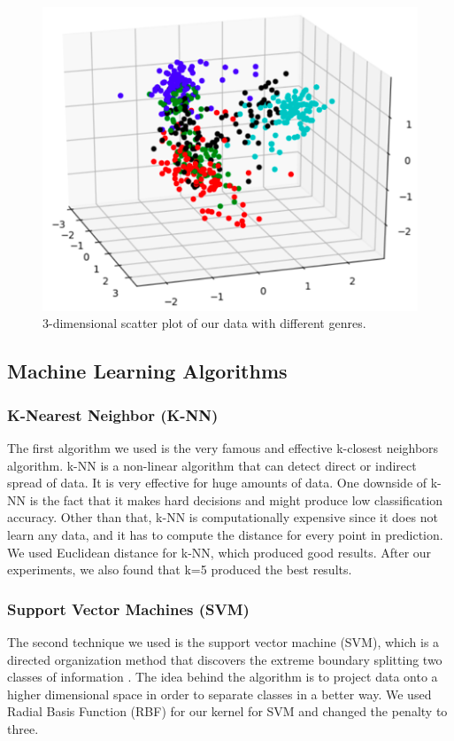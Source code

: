 \begin{figure}
\begin{center}
\includegraphics[scale=0.3]{./figures/3_d_plot.png}
\end{center}
\caption
{
3-dimensional scatter plot of our data with different genres. 
}
\label{fig:big_picture5}
\end{figure}

\subsection{Machine Learning Algorithms}
\subsubsection{\textbf{K-Nearest Neighbor (K-NN)}}
The first algorithm we used is the very famous and effective k-closest neighbors algorithm. k-NN is a non-linear algorithm that can detect direct or indirect spread of data. It is very effective for huge amounts of data. One downside of k-NN is the fact that it makes hard decisions and might produce low classification accuracy. Other than that, k-NN is computationally expensive since it does not learn any data, and it has to compute the distance for every point in prediction. We used Euclidean distance for k-NN, which produced good results. After our experiments, we also found that k=5 produced the best results. 

\subsubsection{\textbf{Support Vector Machines (SVM)}}
The second technique we used is the support vector machine (SVM), which is a directed organization method that discovers the extreme boundary splitting two classes of information \cite{SVM:2006}. The idea behind the algorithm is to project data onto a higher dimensional space in order to separate classes in a better way. We used Radial Basis Function (RBF) for our kernel for SVM and changed the penalty to three. 

